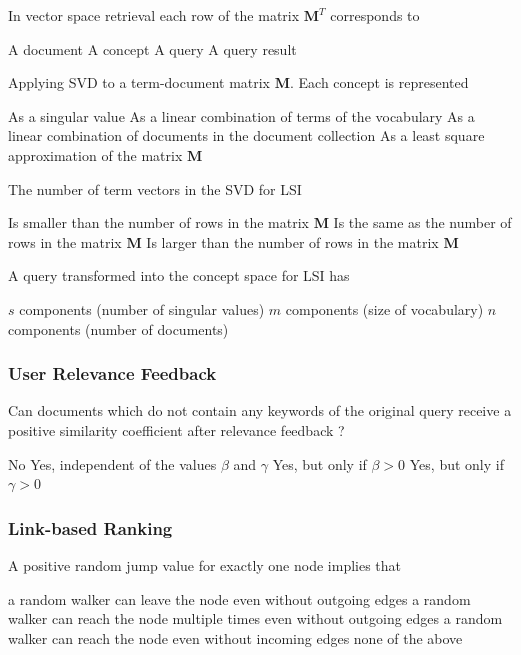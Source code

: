 \documentclass[12pt,a4paper]{exam} %
\newcommand{\mat}[1]{\ensuremath{\textbf{#1}}}
\begin{document}
\begin{flushleft}
\begin{multicols*}{2}
\begin{questions}
\question In vector space retrieval each row of the matrix $\mat{M}^T$ corresponds to
\begin{checkboxes}
\CorrectChoice A document
\choice A concept
\choice A query
\choice A query result
\end{checkboxes}

\question Applying SVD to a term-document matrix \mat{M}. Each concept is represented
\begin{checkboxes}
\choice As a singular value
\CorrectChoice As a linear combination of terms of the vocabulary
\choice As a linear combination of documents in the document collection
\choice As a least square approximation of the matrix \mat{M}
\end{checkboxes}

\question The number of term vectors in the SVD for LSI
\begin{checkboxes}
\choice Is smaller than the number of rows in the matrix \mat{M}
\CorrectChoice Is the same as the number of rows in the matrix \mat{M}
\choice Is larger than the number of rows in the matrix \mat{M}
\end{checkboxes}

\question A query transformed into the concept space for LSI has
\begin{checkboxes}
\CorrectChoice $s$ components (number of singular values)
\choice $m$ components (size of vocabulary)
\choice $n$ components (number of documents)
\end{checkboxes}


\subsubsection{User Relevance Feedback}

\question Can documents which do not contain any keywords of the original query receive a positive similarity coefficient after relevance feedback ?
\begin{checkboxes}
\choice No
\choice Yes, independent of the values $\beta$ and $\gamma$
\CorrectChoice Yes, but only if $\beta>0$
\choice Yes, but only if $\gamma>0$
\end{checkboxes}


\subsubsection{Link-based Ranking}

\question A positive random jump value for exactly one node implies that
\begin{checkboxes}
\CorrectChoice a random walker can leave the node even without outgoing edges
\choice a random walker can reach the node multiple times even without outgoing edges
\CorrectChoice a random walker can reach the node even without incoming edges
\choice none of the above
\end{checkboxes}


\end{questions}
\end{multicols*}
\end{flushleft}
\end{document}
